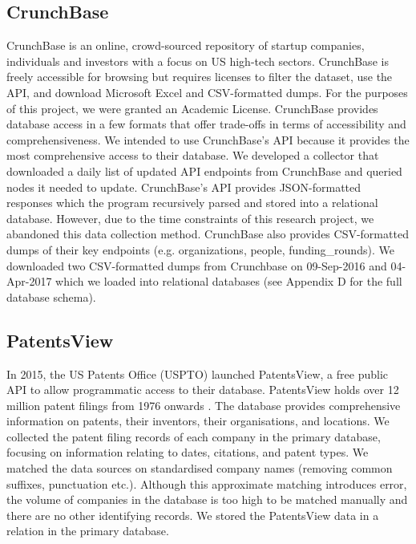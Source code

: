 \documentclass[../thesis/thesis.tex]{subfiles}
\begin{document}
\begin{enumerate}
\subsection{CrunchBase}

CrunchBase is an online, crowd-sourced repository of startup companies, individuals and investors with a focus on US high-tech sectors. CrunchBase is freely accessible for browsing but requires licenses to filter the dataset, use the API, and download Microsoft Excel and CSV-formatted dumps. For the purposes of this project, we were granted an Academic License. CrunchBase provides database access in a few formats that offer trade-offs in terms of accessibility and comprehensiveness. We intended to use CrunchBase’s API because it provides the most comprehensive access to their database. We developed a collector that downloaded a daily list of updated API endpoints from CrunchBase and queried nodes it needed to update. CrunchBase’s API provides JSON-formatted responses which the program recursively parsed and stored into a relational database. However, due to the time constraints of this research project, we abandoned this data collection method. CrunchBase also provides CSV-formatted dumps of their key endpoints (e.g. organizations, people, funding_rounds). We downloaded two CSV-formatted dumps from Crunchbase on 09-Sep-2016 and 04-Apr-2017 which we loaded into relational databases (see Appendix D for the full database schema).

\subsection{PatentsView}

In 2015, the US Patents Office (USPTO) launched PatentsView, a free public API to allow programmatic access to their database. PatentsView holds over 12 million patent filings from 1976 onwards \cite{schultz2016}. The database provides comprehensive information on patents, their inventors, their organisations, and locations. We collected the patent filing records of each company in the primary database, focusing on information relating to dates, citations, and patent types. We matched the data sources on standardised company names (removing common suffixes, punctuation etc.). Although this approximate matching introduces error, the volume of companies in the database is too high to be matched manually and there are no other identifying records. We stored the PatentsView data in a relation in the primary database.


\end{enumerate}
\end{document}
